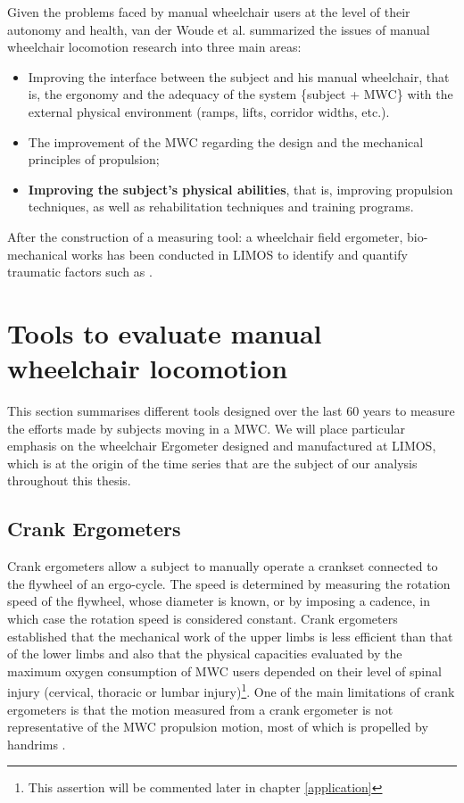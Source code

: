 Given the problems faced by manual wheelchair users at the level of
their autonomy and health, van der Woude et al. \cite{van2005wheelchair} \cite{woude1986wheelchair} summarized the issues of manual wheelchair locomotion research into three main areas:

\begin{itemize}
\item Improving the interface between the subject and his manual wheelchair, that is, the ergonomy and the adequacy of the system \{subject + MWC\} with the external physical environment (ramps, lifts, corridor widths, etc.).
\item The improvement of the MWC regarding the design and the mechanical principles of propulsion;
\item \textbf{Improving the subject's physical abilities}, that is, improving propulsion techniques, as well as rehabilitation techniques and training programs.
\end{itemize}

After the construction of a measuring tool: a wheelchair field ergometer,  bio-mechanical works has been conducted in LIMOS to identify and quantify traumatic factors such as \cite{Remy2005}  \cite{Sauret2010}. 

\section[Evaluation tools]{Tools to evaluate manual wheelchair locomotion}
This section summarises different tools designed over the last 60 years to measure the efforts made by subjects moving in a MWC. We will place particular emphasis on the wheelchair  Ergometer designed and manufactured at LIMOS, which is at the origin of the time series that are the subject of our analysis throughout this thesis.

\subsection{Crank Ergometers}
Crank ergometers allow a subject to manually operate a crankset connected to the flywheel of an ergo-cycle. The speed is determined by measuring the rotation speed of the flywheel, whose diameter is known, or by imposing a cadence, in which case the rotation speed is considered constant. Crank ergometers established that the mechanical work of the upper limbs is less efficient than that of the lower limbs and also that the physical capacities evaluated by the maximum oxygen consumption of MWC users depended on their level of spinal injury (cervical, thoracic or lumbar injury)\footnote{This assertion will be commented later in chapter \ref{application}}. One of the main limitations of crank ergometers is that the motion measured from a crank ergometer is not representative of the MWC propulsion motion, most of which is propelled by handrims \cite{0aastrand1961maximal}  \cite{bergh1976maximal}    \cite{stenberg1967hemodynamic}.

